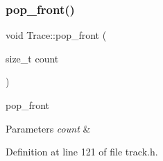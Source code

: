 \subsubsection{\texorpdfstring{pop\+\_\+front()}{pop\_front()}}
{\footnotesize\ttfamily void Trace\+::pop\+\_\+front (\begin{DoxyParamCaption}\item[{size\+\_\+t}]{count }\end{DoxyParamCaption})\hspace{0.3cm}{\ttfamily [inline]}}



pop\+\_\+front 


\begin{DoxyParams}{Parameters}
{\em count} & \\
\hline
\end{DoxyParams}


Definition at line 121 of file track.\+h.


